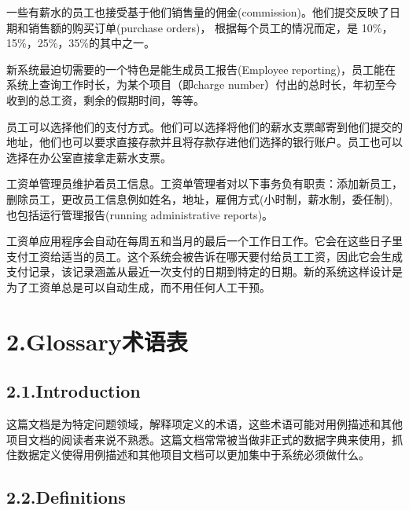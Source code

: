 \documentclass{article}
\begin{document}
一些有薪水的员工也接受基于他们销售量的佣金(commission)。他们提交反映了日期和销售额的购买订单(purchase orders)， 根据每个员工的情况而定，是 10\%，15\%，25\%，35\%的其中之一。%

新系统最迫切需要的一个特色是能生成员工报告(Employee reporting)，员工能在系统上查询工作时长，为某个项目（即charge number）付出的总时长，年初至今收到的总工资，剩余的假期时间，等等。%

员工可以选择他们的支付方式。他们可以选择将他们的薪水支票邮寄到他们提交的地址，他们也可以要求直接存款并且将存款存进他们选择的银行账户。员工也可以选择在办公室直接拿走薪水支票。%

工资单管理员维护着员工信息。工资单管理者对以下事务负有职责：添加新员工，删除员工，更改员工信息例如姓名，地址，雇佣方式(小时制，薪水制，委任制),也包括运行管理报告(running administrative reports)。%

工资单应用程序会自动在每周五和当月的最后一个工作日工作。它会在这些日子里支付工资给适当的员工。这个系统会被告诉在哪天要付给员工工资，因此它会生成支付记录，该记录涵盖从最近一次支付的日期到特定的日期。新的系统这样设计是为了工资单总是可以自动生成，而不用任何人工干预。%

\section{2.\hspace*{0.5em}Glossary术语表}\label{sec-glossary}%

\subsection{2.1.\hspace*{0.5em}Introduction}\label{sec-introduction}%

\noindent{}这篇文档是为特定问题领域，解释项定义的术语，这些术语可能对用例描述和其他项目文档的阅读者来说不熟悉。这篇文档常常被当做非正式的数据字典来使用，抓住数据定义使得用例描述和其他项目文档可以更加集中于系统必须做什么。%

\subsection{2.2.\hspace*{0.5em}Definitions}\label{sec-definitions}%
\end{document}
